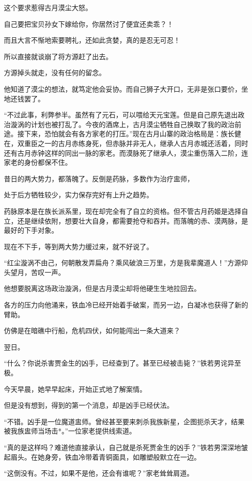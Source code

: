 \begin{this_body}
这个要求惹得古月漠尘大怒。

自己要把宝贝孙女下嫁给你，你居然讨了便宜还卖乖？！

而且大言不惭地索要聘礼，还如此贪婪，真的是忍无可忍！

所以直接就谈崩了将方源赶了出去。

方源掉头就走，没有任何的留念。

他知道了漠尘的想法，就笃定他会妥协。而自己狮子大开口，无非是张口要价，坐地还钱罢了。

“不过此事，利弊参半。虽然有了元石，可以喂给天元宝莲。但是自己原先退出政治漩涡的计划也被打乱了。今夜的酒席上，古月漠尘牺牲自己换取了我的政治前途。接下来，恐怕就会有各方家老的打压。”现在古月山寨的政治格局是：族长健在，双重臣之一的古月赤练身死，但赤脉并非无人，继承人古月赤城还活着，同时还有古月赤钟这样的同出一脉的家老。而漠脉死了继承人，漠尘重伤落入二阶，连家老的身份都保不住。

昔日的两大势力，都落魄了。反倒是药脉，多数作为治疗盅师，

处于后方牺牲较少，实力保存完好有上升之趋势。

药脉原本是在族长派系里，现在却完全有了自立的资格。但不管古月药姬是选择自立，还是继续依附，想要壮大自身，都需要抢夺和吞并。而落魄的赤、漠两脉，是最好的下手对象。

现在不下手，等到两大势力缓过来，就不好说了。

“红尘漩涡不由己，何朝散发弄扁舟？乘风破浪三万里，方是我辈魔道人！”方源仰头望月，苦叹一声。

他想要脱离这场政治漩涡，但是古月漠尘却将他硬生生地拉回去。

各方的压力向他涌来，铁血冷已经开始着手破案，而另一边，白凝冰也获得了新的臂助。

仿佛是在暗礁中行船，危机四伏，如何能闯出一条大道来？

翌日。

“什么？你说杀害贾金生的凶手，已经查到了。甚至已经被击毙？”铁若男诧异至极。

今天早晨，她早早起床，开始正式地了解案情。

但是没有想到，得到的第一个消息，却是凶手已经伏法。

“不错。凶手是一位魔道盅师。曾经甚至要来刺杀我族新星，企图扼杀天才，结果被我族盅师当场击*。”一位家老提供线索道。

“真的是这样吗？难道他直接承认，自己就是杀死贾金生的凶手？”铁若男深深地皱起眉头。在她身旁，铁血冷带着青铜面具，如雕塑般默立在一边。

“这倒没有。不过，如果不是他，还会有谁呢？”家老耸耸肩道。


\end{this_body}
